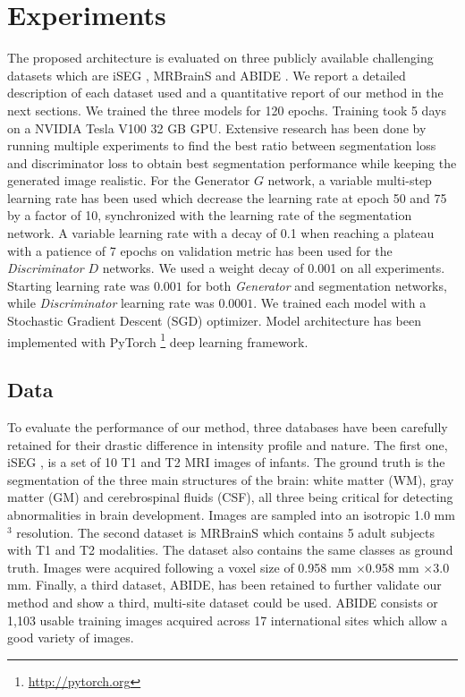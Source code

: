 \documentclass[preprint,12pt]{elsarticle}
\newcommand{\ttm}{$\times$}
\begin{document}
\section{Experiments}
The proposed architecture is evaluated on three publicly available challenging datasets which are iSEG \cite{Wang2019}, MRBrainS \cite{Mendrik2015} and ABIDE \cite{DiMartino2014}. We report a detailed description of each dataset used and a quantitative report of our method in the next sections. We trained the three models for 120 epochs. Training took 5 days on a NVIDIA Tesla V100 32 GB GPU. Extensive research has been done by running multiple experiments to find the best ratio between segmentation loss and discriminator loss to obtain best segmentation performance while keeping the generated image realistic. For the Generator $G$ network, a variable multi-step learning rate has been used which decrease the learning rate at epoch 50 and 75 by a factor of 10, synchronized with the learning rate of the segmentation network. A variable learning rate with a decay of 0.1 when reaching a plateau with a patience of 7 epochs on validation metric has been used for the \emph{Discriminator} $D$ networks. We used a weight decay of 0.001 on all experiments. Starting learning rate was $0.001$ for both \emph{Generator} and segmentation networks, while \emph{Discriminator} learning rate was $0.0001$. We trained each model with a Stochastic Gradient Descent (SGD) optimizer. Model architecture has been implemented with PyTorch \footnote{\url{http://pytorch.org}} deep learning framework.

\subsection{Data}

To evaluate the performance of our method, three databases have been carefully retained for their drastic difference in intensity profile and nature. The first one, iSEG \cite{Wang2019}, is a set of 10 T1 and T2 MRI images of infants. The ground truth is the segmentation of the three main structures of the brain: white matter (WM), gray matter (GM) and cerebrospinal fluids (CSF), all three being critical for detecting abnormalities in brain development. Images are sampled into an isotropic 1.0 mm$^3$ resolution. The second dataset is MRBrainS \cite{Mendrik2015} which contains 5 adult subjects with T1 and T2 modalities. The dataset also contains the same classes as ground truth. Images were acquired following a voxel size of 0.958 mm \ttm 0.958 mm \ttm 3.0 mm. Finally, a third dataset, ABIDE, has been retained to further validate our method and show a third, multi-site dataset could be used. ABIDE consists or 1,103 usable training images acquired across 17 international sites which allow a good variety of images.
\end{document}
